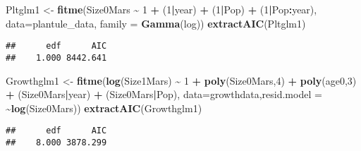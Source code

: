 \documentclass[
]{article}
\newenvironment{Shaded}{\begin{snugshade}}{\end{snugshade}}
\newcommand{\AttributeTok}[1]{\textcolor[rgb]{0.13,0.29,0.53}{#1}}
\newcommand{\DecValTok}[1]{\textcolor[rgb]{0.00,0.00,0.81}{#1}}
\newcommand{\FunctionTok}[1]{\textcolor[rgb]{0.13,0.29,0.53}{\textbf{#1}}}
\newcommand{\NormalTok}[1]{#1}
\newcommand{\OtherTok}[1]{\textcolor[rgb]{0.56,0.35,0.01}{#1}}
\newcommand{\SpecialCharTok}[1]{\textcolor[rgb]{0.81,0.36,0.00}{\textbf{#1}}}
\begin{document}
\begin{Shaded}
\begin{Highlighting}[]
\NormalTok{Pltglm1 }\OtherTok{\textless{}{-}} \FunctionTok{fitme}\NormalTok{(Size0Mars }\SpecialCharTok{\textasciitilde{}} \DecValTok{1} \SpecialCharTok{+}\NormalTok{ (}\DecValTok{1}\SpecialCharTok{|}\NormalTok{year) }\SpecialCharTok{+}\NormalTok{ (}\DecValTok{1}\SpecialCharTok{|}\NormalTok{Pop) }\SpecialCharTok{+}\NormalTok{ (}\DecValTok{1}\SpecialCharTok{|}\NormalTok{Pop}\SpecialCharTok{:}\NormalTok{year), }
                 \AttributeTok{data=}\NormalTok{plantule\_data,}
                 \AttributeTok{family =} \FunctionTok{Gamma}\NormalTok{(log))}
\FunctionTok{extractAIC}\NormalTok{(Pltglm1)}
\end{Highlighting}
\end{Shaded}

\begin{verbatim}
##      edf      AIC 
##    1.000 8442.641
\end{verbatim}

\begin{Shaded}
\begin{Highlighting}[]
\NormalTok{Growthglm1 }\OtherTok{\textless{}{-}} \FunctionTok{fitme}\NormalTok{(}\FunctionTok{log}\NormalTok{(Size1Mars) }\SpecialCharTok{\textasciitilde{}} \DecValTok{1} \SpecialCharTok{+} 
                      \FunctionTok{poly}\NormalTok{(Size0Mars,}\DecValTok{4}\NormalTok{) }\SpecialCharTok{+} \FunctionTok{poly}\NormalTok{(age0,}\DecValTok{3}\NormalTok{) }\SpecialCharTok{+} 
\NormalTok{                      (Size0Mars}\SpecialCharTok{|}\NormalTok{year) }\SpecialCharTok{+}\NormalTok{ (Size0Mars}\SpecialCharTok{|}\NormalTok{Pop),}
                    \AttributeTok{data=}\NormalTok{growthdata,}\AttributeTok{resid.model =} \SpecialCharTok{\textasciitilde{}}\FunctionTok{log}\NormalTok{(Size0Mars))}
\FunctionTok{extractAIC}\NormalTok{(Growthglm1)}
\end{Highlighting}
\end{Shaded}

\begin{verbatim}
##      edf      AIC 
##    8.000 3878.299
\end{verbatim}
\end{document}
